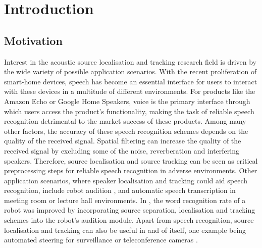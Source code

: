 \chapter{Introduction}

\section{Motivation}
Interest in the acoustic source localisation and tracking research field is driven by the wide variety of possible application scenarios. With the recent proliferation of smart-home devices, speech has become an essential interface for users to interact with these devices in a multitude of different environments. For products like the Amazon Echo or Google Home Speakers, voice is the primary interface through which users access the product's functionality, making the task of reliable speech recognition detrimental to the market success of these products. Among many other factors, the accuracy of these speech recognition schemes depends on the quality of the received signal. Spatial filtering can increase the quality of the received signal by excluding some of the noise, reverberation and interfering speakers. Therefore, source localisation and source tracking can be seen as critical preprocessing steps for reliable speech recognition in adverse environments. Other application scenarios, where speaker localisation and tracking could aid speech recognition, include robot audition \cite{Frechette2012}, \cite{Evers2015} and automatic speech transcription in meeting room \cite{Busso2005} or lecture hall \cite{Parviainen2006} environments. In \cite{Frechette2012}, the word recognition rate of a robot was improved by incorporating source separation, localisation and tracking schemes into the robot's audition module.  Apart from speech recognition, source localisation and tracking can also be useful in and of itself, one example being automated steering for surveillance or teleconference cameras \cite{Wang1997}.



	